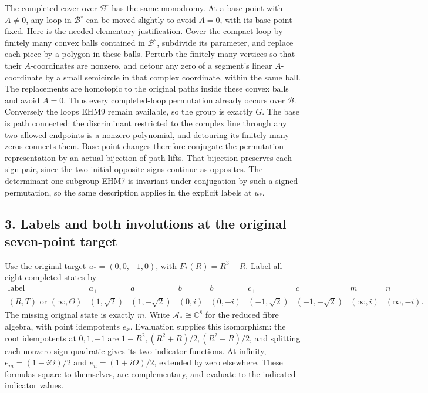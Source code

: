\documentclass[
  10pt,
  a4paper,
]{article}
\begin{document}
The completed cover over \(\mathcal B^\circ\) has the same monodromy. At
a base point with \(A\ne0\), any loop in \(\mathcal B^\circ\) can be
moved slightly to avoid \(A=0\), with its base point fixed. Here is the
needed elementary justification. Cover the compact loop by finitely many
convex balls contained in \(\mathcal B^\circ\), subdivide its parameter,
and replace each piece by a polygon in these balls. Perturb the finitely
many vertices so that their \(A\)-coordinates are nonzero, and detour
any zero of a segment's linear \(A\)-coordinate by a small semicircle in
that complex coordinate, within the same ball. The replacements are
homotopic to the original paths inside these convex balls and avoid
\(A=0\). Thus every completed-loop permutation already occurs over
\(\mathcal B\). Conversely the loops EHM9 remain available, so the group
is exactly \(G\). The base is path connected: the discriminant
restricted to the complex line through any two allowed endpoints is a
nonzero polynomial, and detouring its finitely many zeros connects them.
Base-point changes therefore conjugate the permutation representation by
an actual bijection of path lifts. That bijection preserves each sign
pair, since the two initial opposite signs continue as opposites. The
determinant-one subgroup EHM7 is invariant under conjugation by such a
signed permutation, so the same description applies in the explicit
labels at \(u_*\).

\subsection{3. Labels and both involutions at the original seven-point
target}\label{labels-and-both-involutions-at-the-original-seven-point-target}

Use the original target \(u_*=(0,0,-1,0)\), with \(F_*(R)=R^3-R\). Label
all eight completed states by \[
\begin{array}{c|cccccccc}
\text{label}&a_+&a_-&b_+&b_-&c_+&c_-&m&n\\\hline
(R,T)\text{ or }(\infty,\Theta)&(1,\sqrt2)&(1,-\sqrt2)&(0,i)&(0,-i)&(-1,\sqrt2)&(-1,-\sqrt2)&(\infty,i)&(\infty,-i).
\end{array}
\tag{EHM10}
\] The missing original state is exactly \(m\). Write
\(\mathcal A_*\cong\mathbb C^8\) for the reduced fibre algebra, with
point idempotents \(e_x\). Evaluation supplies this isomorphism: the
root idempotents at \(0,1,-1\) are \(1-R^2,(R^2+R)/2,(R^2-R)/2\), and
splitting each nonzero sign quadratic gives its two indicator functions.
At infinity, \(e_m=(1-i\Theta)/2\) and \(e_n=(1+i\Theta)/2\), extended
by zero elsewhere. These formulas square to themselves, are
complementary, and evaluate to the indicated indicator values.
\end{document}
